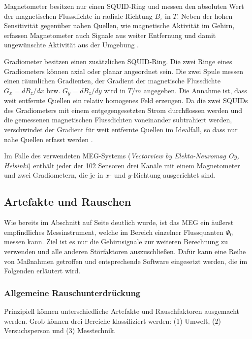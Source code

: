 \documentclass[doc,a4paper,12pt]{apa6}
\makeatletter
\DeclareRobustCommand*{\nameref}[1]{%
      \glqq{\myorg@nameref{#1}}\grqq%
    }%
\makeatother
\begin{document}
Magnetometer besitzen nur einen SQUID-Ring und messen den absoluten Wert der magnetischen Flussdichte in radiale Richtung $B_z$ in $T$. Neben der hohen Sensitivität gegenüber nahen Quellen, wie magnetische Aktivität im Gehirn, erfassen Magnetometer auch Signale aus weiter Entfernung und damit ungewünschte Aktivität aus der Umgebung \parencite{hansen2010meg}.

Gradiometer besitzen einen zusätzlichen SQUID-Ring. Die zwei Ringe eines Gradiometers können axial oder planar angeordnet sein. Die zwei Spule messen einen räumlichen Gradienten, der Gradient der magnetische Flussdichte $G_x = dB_z/dx$ bzw. $G_y = dB_z/dy$ wird in $T/m$ angegeben. Die Annahme ist, dass weit entfernte Quellen ein relativ homogenes Feld erzeugen. Da die zwei SQUIDs des Gradiometers mit einem entgegengesetzten Strom durchflossen werden und die gemessenen magnetischen Flussdichten voneinander subtrahiert werden, verschwindet der Gradient für weit entfernte Quellen im Idealfall, so dass nur nahe Quellen erfasst werden \parencite{hansen2010meg}.

Im Falle des verwendeten MEG-Systems (\emph{Vectorview by Elekta-Neuromag Oy, Helsinki}) enthält jeder der 102 Sensoren drei Kanäle mit einem Magnetometer und zwei Gradiometern, die je in $x$- und $y$-Richtung ausgerichtet sind.

\subsection{Artefakte und Rauschen}

Wie bereits im Abschnitt \nameref{sec:squids} auf Seite \pageref{sec:squids} deutlich wurde, ist das MEG ein äußerst empfindliches Messinstrument, welche im Bereich einzelner Flussquanten $\Phi_0$ messen kann. Ziel ist es nur die Gehirnsignale zur weiteren Berechnung zu verwenden und alle anderen Störfaktoren auszuschließen. Dafür kann eine Reihe von Maßnahmen getroffen und entsprechende Software eingesetzt werden, die im Folgenden erläutert wird.

\subsubsection{Allgemeine Rauschunterdrückung}
\label{sec:rauschen}

Prinzipiell können unterschiedliche Artefakte und Rauschfaktoren ausgemacht werden. Grob können drei Bereiche klassifiziert werden: (1) Umwelt, (2) Versuchsperson und (3) Messtechnik.
\end{document}
